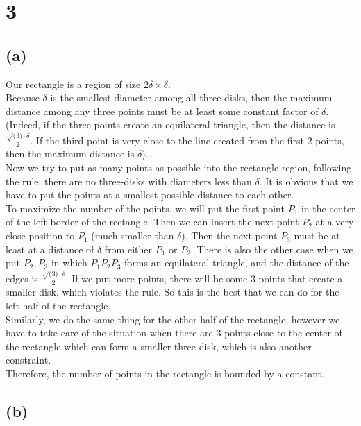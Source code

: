 
\section*{3}
\subsection*{(a)}
Our rectangle is a region of size $2 \delta \times \delta$. \\

Because $\delta$ is the smallest diameter among all three-disks, then the maximum distance among any three points must be at least some constant factor of $\delta$. (Indeed, if the three points create an equilateral triangle, then the distance is 
$\frac{\sqrt(3) \cdot \delta} {2}$. If the third point is very close to the line created from the first 2 points, then the maximum distance is $\delta$).\\

Now we try to put as many points as possible into the rectangle region, following the rule: there are no three-disks with diameters less than $\delta$. It is obvious that we have to put the points at a smallest possible distance to each other. \\

To maximize the number of the points, we will put the first point $P_1$ in the center of the left border of the rectangle. Then we can insert the next point $P_2$ at a very close position to $P_1$ (much smaller than $\delta$). Then the next point $P_3$ must be at least at a distance of $\delta$ from either $P_1$ or $P_2$. There is also the other case when we put $P_2, P_3$ in which $P_1P_2P_3$ forms an equilateral triangle, and the distance of the edges is $\frac{\sqrt(3) \cdot \delta} {2}$. If we put more points, there will be some 3 points that create a smaller disk, which violates the rule. So this is the best that we can do for the left half of the rectangle.\\

Similarly, we do the same thing for the other half of the rectangle, however we have to take care of the situation when there are 3 points close to the center of the rectangle which can form a smaller three-disk, which is also another constraint. \\

Therefore, the number of points in the rectangle is bounded by a constant.

\subsection*{(b)}

